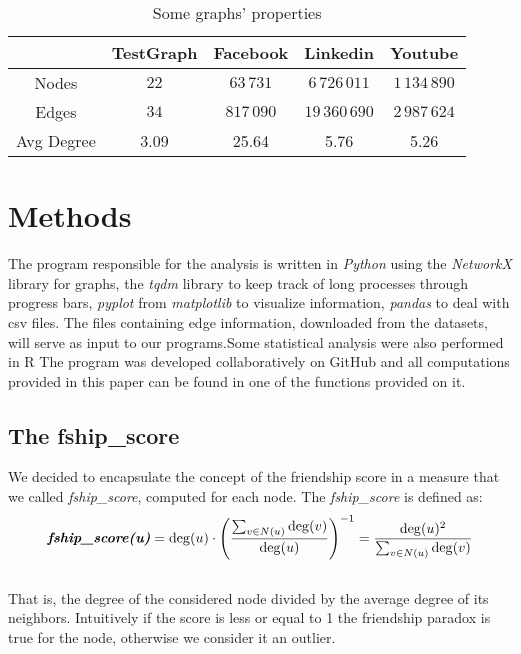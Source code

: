\documentclass{article}
\begin{document}
\begin{table}[ht]
\centering
\begin{tabular}{|c|c|c|c|c|}
\hline
& TestGraph & Facebook & Linkedin & Youtube \\ \hline
Nodes & $22$ & $63\,731$ & $6\,726\,011$ & $1\,134\,890$\\ \hline
Edges & $34$ & $817\,090$ & $19\,360\,690$ & $2\,987\,624$ \\ \hline
Avg Degree & 3.09 & 25.64 &  5.76 & 5.26 \\ \hline 
\end{tabular}
\caption{Some graphs' properties}
\end{table} 

\section{Methods}
The program responsible for the analysis is written in \textit{Python} using the \textit{NetworkX} library for graphs, the \textit{tqdm} library to keep track of long processes through progress bars, \textit{pyplot} from \textit{matplotlib} to visualize information, \textit{pandas} to deal with csv files. The files containing edge information, downloaded from the datasets, will serve as input to our programs.Some statistical analysis were also performed in R
The program was developed collaboratively on GitHub\cite{Github_repo} and all computations provided in this paper can be found in one of the functions provided on it.

\subsection{The fship\_score}
We decided to encapsulate the concept of the friendship score in a measure that we called \textit{fship\_score}, computed for each node. 
The \textit{fship\_score} is defined as:
\\\[
\textit{\textbf{fship\_score(u)}} = \deg(u) \cdot \left( \frac{\sum_{v \in N(u)} \deg(v)}{\deg(u)} \right)^{-1} =
\frac{\deg(u)^{2}}{\sum_{v \in N(u)} \deg(v)}
\]\\
That is, the degree of the considered node divided by the average degree of its neighbors. Intuitively if the score is less or equal to 1 the friendship paradox is true for the node, otherwise we consider it an outlier.
\end{document}
